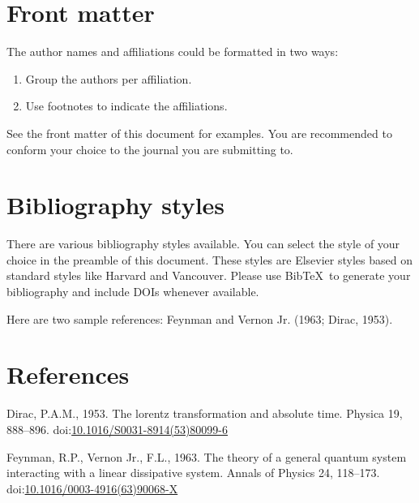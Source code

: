\documentclass[]{elsarticle} %
\begin{document}
\hypertarget{front-matter}{%
\section{Front matter}\label{front-matter}}

The author names and affiliations could be formatted in two ways:

\begin{enumerate}
\def\labelenumi{(\arabic{enumi})}
\item
  Group the authors per affiliation.
\item
  Use footnotes to indicate the affiliations.
\end{enumerate}

See the front matter of this document for examples. You are recommended
to conform your choice to the journal you are submitting to.

\hypertarget{bibliography-styles}{%
\section{Bibliography styles}\label{bibliography-styles}}

There are various bibliography styles available. You can select the
style of your choice in the preamble of this document. These styles are
Elsevier styles based on standard styles like Harvard and Vancouver.
Please use BibTeX~to generate your bibliography and include DOIs
whenever available.

Here are two sample references: Feynman and Vernon Jr. (1963; Dirac,
1953).

\hypertarget{references}{%
\section*{References}\label{references}}

\hypertarget{refs}{}
\leavevmode\hypertarget{ref-Dirac1953888}{}%
Dirac, P.A.M., 1953. The lorentz transformation and absolute time.
Physica 19, 888--896.
doi:\href{https://doi.org/10.1016/S0031-8914(53)80099-6}{10.1016/S0031-8914(53)80099-6}

\leavevmode\hypertarget{ref-Feynman1963118}{}%
Feynman, R.P., Vernon Jr., F.L., 1963. The theory of a general quantum
system interacting with a linear dissipative system. Annals of Physics
24, 118--173.
doi:\href{https://doi.org/10.1016/0003-4916(63)90068-X}{10.1016/0003-4916(63)90068-X}
\end{document}
